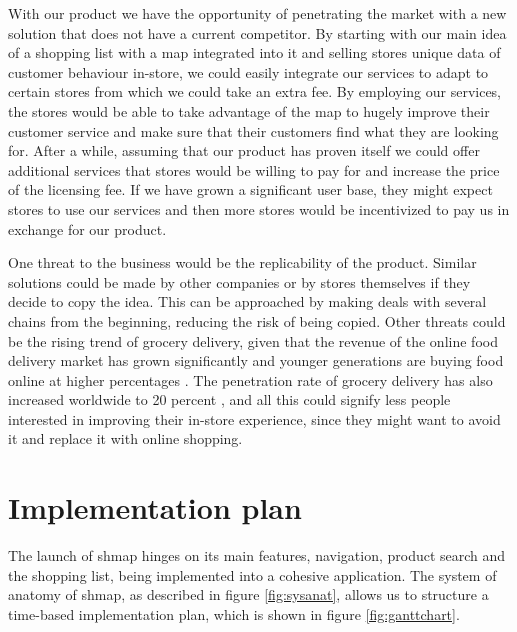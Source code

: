 \documentclass[titlepage]{article}
\def\companyName{shmap}
\begin{document}
With our product we have the opportunity of penetrating the market with a new solution that does not have a current competitor. By starting with our main idea of a shopping list with a map integrated into it and selling stores unique data of customer behaviour in-store, we could easily integrate our services to adapt to certain stores from which we could take an extra fee. By employing our services, the stores would be able to take advantage of the map to hugely improve their customer service and make sure that their customers find what they are looking for. After a while, assuming that our product has proven itself we could offer additional services that stores would be willing to pay for and increase the price of the licensing fee. If we have grown a significant user base, they might expect stores to use our services and then more stores would be incentivized to pay us in exchange for our product.

One threat to the business would be the replicability of the product. Similar solutions could be made by other companies or by stores themselves if they decide to copy the idea. This can be approached by making deals with several chains from the beginning, reducing the risk of being copied. Other threats could be the rising trend of grocery delivery, given that the revenue of the online food delivery market has grown significantly \cite{stat-revenue} and younger generations are buying food online at higher percentages \cite{stat-generation}. The penetration rate of grocery delivery has also increased worldwide to 20 percent \cite{stat-penetration}, and all this could signify less people interested in improving their in-store experience, since they might want to avoid it and replace it with online shopping.

\section{Implementation plan}

The launch of shmap hinges on its main features, navigation, product search and the shopping list, being implemented into a cohesive application. The system of anatomy of \companyName, as described in figure \ref{fig:sysanat}, allows us to structure a time-based implementation plan, which is shown in figure \ref{fig:ganttchart}.
\end{document}
